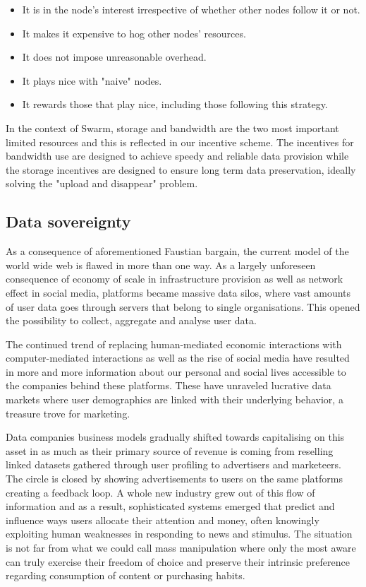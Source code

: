 \begin{itemize}
    \item  It is in the node's interest irrespective of whether other nodes follow it or not.
    \item It makes it expensive to hog other nodes' resources.
    \item It does not impose unreasonable overhead.
    \item It plays nice with "naive" nodes.
    \item It rewards those that play nice, including those following this strategy.
\end{itemize}

In the context of Swarm, storage and bandwidth are the two most important limited resources and this is reflected in our incentive scheme. The incentives for bandwidth use are designed to achieve speedy and reliable data provision while the storage incentives are designed to ensure long term data preservation, ideally solving the "upload and disappear" problem.

\subsection{Data sovereignty}

As a consequence of aforementioned Faustian bargain, the current model of the world wide web is flawed in more than one way. As a largely unforeseen consequence of economy of scale in infrastructure provision as well as network effect in social media, platforms became massive data silos, where vast amounts of user data goes through servers that belong to single organisations. This opened the possibility to collect, aggregate and analyse user data. 

The  continued trend of replacing human-mediated economic interactions with computer-mediated interactions as well as the rise of social media have resulted in more and more information about our personal and social lives accessible to the companies behind these platforms. These have unraveled lucrative data markets where user demographics are linked with their underlying behavior, a treasure trove for marketing.

Data companies business models gradually shifted towards capitalising on this asset in as much as their primary source of revenue is coming from reselling linked datasets gathered through user profiling to advertisers and marketeers. The circle is closed by showing advertisements to users on the same platforms creating a feedback loop. A whole new industry grew out of this flow of information and as  a result, sophisticated systems emerged that predict and influence ways users allocate their attention and money, often knowingly exploiting human weaknesses in responding to news and stimulus. The situation is not far from what we could call mass manipulation where only the most aware can truly exercise their freedom of choice and preserve their intrinsic preference regarding consumption of content or purchasing habits.

